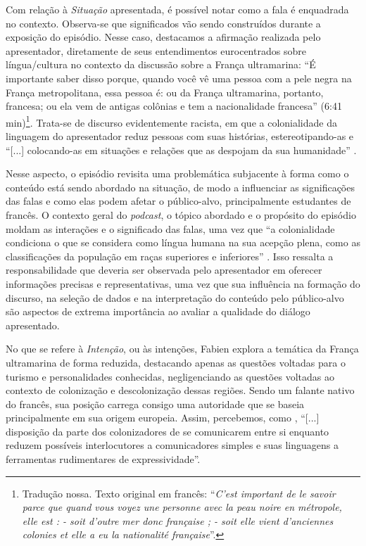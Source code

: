 \documentclass[portuguese]{textolivre}
\begin{document}
Com relação à \emph{Situação} apresentada, é possível notar como a fala é enquadrada no contexto. Observa-se que significados vão sendo construídos durante a exposição do episódio. Nesse caso, destacamos a afirmação realizada pelo apresentador, diretamente de seus entendimentos eurocentrados sobre língua/cultura no contexto da discussão sobre a França ultramarina: “É importante saber disso porque, quando você vê uma pessoa com a pele negra na França metropolitana, essa pessoa é: ou da França ultramarina, portanto, francesa; ou ela vem de antigas colônias e tem a nacionalidade francesa” (6:41 min)\footnote{Tradução nossa. Texto original em francês: “\textit{C’est important de le savoir parce que quand vous voyez une personne avec la peau noire en métropole, elle est : - soit d’outre mer donc française ; - soit elle vient d’anciennes colonies et elle a eu la nationalité française}”.}. Trata-se de discurso evidentemente racista, em que a colonialidade da linguagem do apresentador reduz pessoas com suas histórias, estereotipando-as e “[...] colocando-as em situações e relações que as despojam da sua humanidade” \cite[p. 86]{veronelli_sobre_2021}.

Nesse aspecto, o episódio revisita uma problemática subjacente à forma como o conteúdo está sendo abordado na situação, de modo a influenciar as significações das falas e como elas podem afetar o público-alvo, principalmente estudantes de francês. O contexto geral do \textit{podcast}, o tópico abordado e o propósito do episódio moldam as interações e o significado das falas, uma vez que “a colonialidade condiciona o que se considera como língua humana na sua acepção plena, como as classificações da população em raças superiores e inferiores” \cite[p. 89]{veronelli_sobre_2021}. Isso ressalta a responsabilidade que deveria ser observada pelo apresentador em oferecer informações precisas e representativas, uma vez que sua influência na formação do discurso, na seleção de dados e na interpretação do conteúdo pelo público-alvo são aspectos de extrema importância ao avaliar a qualidade do diálogo apresentado.

No que se refere à \emph{Intenção}, ou às intenções, Fabien explora a temática da França ultramarina de forma reduzida, destacando apenas as questões voltadas para o turismo e personalidades conhecidas, negligenciando as questões voltadas ao contexto de colonização e descolonização dessas regiões. Sendo um falante nativo do francês, sua posição carrega consigo uma autoridade que se baseia principalmente em sua origem europeia. Assim, percebemos, como \textcite[p. 94]{veronelli_sobre_2021}, “[...] disposição da parte dos colonizadores de se comunicarem entre si enquanto reduzem possíveis interlocutores a comunicadores simples e suas linguagens a ferramentas rudimentares de expressividade”.
\end{document}
